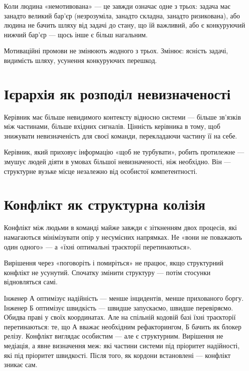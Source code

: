 \documentclass[12pt, a4paper, openany]{book}
\begin{document}
Коли людина «немотивована» --- це завжди означає одне з трьох: задача має занадто великий бар'єр (незрозуміла, занадто складна, занадто ризикована), або людина не бачить шляху від задачі до стану, що їй важливий, або є конкуруючий нижчий бар'єр --- щось інше є більш нагальним.

Мотиваційні промови не змінюють жодного з трьох. Змінює: ясність задачі, видимість шляху, усунення конкуруючих перешкод.

\section{Ієрархія як розподіл невизначеності}

Керівник має більше невидимого контексту відносно системи --- більше зв'язків між частинами, більше вхідних сигналів. Цінність керівника в тому, щоб знижувати невизначеність для своєї команди, перекладаючи частину її на себе.

Керівник, який приховує інформацію «щоб не турбувати», робить протилежне --- змушує людей діяти в умовах більшої невизначеності, ніж необхідно. Він — структурне вузьке місце незалежно від особистої компетентності.

\section{Конфлікт як структурна колізія}

Конфлікт між людьми в команді майже завжди є зіткненням двох процесів, які намагаються мінімізувати опір у несумісних напрямках. Не «вони не поважають один одного» --- а «їхні оптимальні траєкторії перетинаються».

Вирішення через «поговоріть і помиріться» не працює, якщо структурний конфлікт не усунутий. Спочатку змінити структуру --- потім стосунки відновляться самі.

\begin{analogybox}
Інженер А оптимізує надійність --- менше інцидентів, менше прихованого боргу. Інженер Б оптимізує швидкість --- швидше запускаємо, швидше перевіряємо. Обидва праві у своїх координатах. Але на спільній кодовій базі їхні траєкторії перетинаються: те, що А вважає необхідним рефакторингом, Б бачить як блокер релізу. Конфлікт виглядає особистим --- але є структурним. Вирішення не медіація, а явне визначення меж: які частини системи під пріоритет надійності, які під пріоритет швидкості. Після того, як кордони встановлені --- конфлікт зникає сам.
\end{analogybox}
\end{document}
